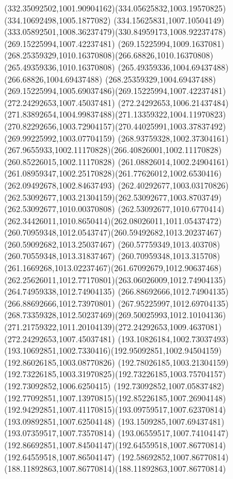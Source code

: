 {{		\curveto(332.35092502,1001.90904162)(334.05625832,1003.19570825)(334.10692498,1005.1877082)
		\curveto(334.15625831,1007.10504149)(333.05892501,1008.36237479)(330.84959173,1008.92237478)
		\moveto(269.15225994,1007.42237481)
		\curveto(269.15225994,1009.1637081)(268.25359329,1010.16370808)(266.68826,1010.16370808)
		\lineto(265.49359336,1010.16370808)
		\lineto(265.49359336,1004.69437488)
		\lineto(266.68826,1004.69437488)
		\curveto(268.25359329,1004.69437488)(269.15225994,1005.69037486)(269.15225994,1007.42237481)
		\moveto(272.24292653,1007.45037481)
		\curveto(272.24292653,1006.21437484)(271.83892654,1004.99837488)(271.13359322,1004.11970823)
		\curveto(270.82292656,1003.72904157)(270.44025991,1003.37837492)(269.99225992,1003.07704159)
		\curveto(268.93759328,1002.37304161)(267.9655933,1002.11170828)(266.40826001,1002.11170828)
		\lineto(260.85226015,1002.11170828)
		\lineto(261.08826014,1002.24904161)
		\curveto(261.08959347,1002.25170828)(261.77626012,1002.6530416)(262.09492678,1002.84637493)
		\curveto(262.40292677,1003.03170826)(262.53092677,1003.21304159)(262.53092677,1003.8703749)
		\lineto(262.53092677,1010.00370808)
		\curveto(262.53092677,1010.6770414)(262.34426011,1010.8650414)(262.08026011,1011.05437472)
		\curveto(260.70959348,1012.0543747)(260.59492682,1013.20237467)(260.59092682,1013.25037467)
		\lineto(260.57759349,1013.403708)
		\lineto(260.70559348,1013.31837467)
		\curveto(260.70959348,1013.315708)(261.1669268,1013.02237467)(261.67092679,1012.90637468)
		\curveto(262.25626011,1012.77170801)(263.06026009,1012.74904135)(264.74959338,1012.74904135)
		\lineto(266.88692666,1012.74904135)
		\lineto(266.88692666,1012.73970801)
		\curveto(267.95225997,1012.69704135)(268.73359328,1012.50237469)(269.50025993,1012.10104136)
		\curveto(271.21759322,1011.20104139)(272.24292653,1009.4637081)(272.24292653,1007.45037481)
		\moveto(193.10826184,1002.73037493)
		\curveto(193.10692851,1002.7330416)(192.95092851,1002.94504159)(192.86026185,1003.08770826)
		\curveto(192.78026185,1003.21304159)(192.73226185,1003.31970825)(192.73226185,1003.75704157)
		\lineto(192.73092852,1006.6250415)
		\curveto(192.73092852,1007.05837482)(192.77092851,1007.13970815)(192.85226185,1007.26904148)
		\curveto(192.94292851,1007.41170815)(193.09759517,1007.62370814)(193.09892851,1007.62504148)
		\lineto(193.1509285,1007.69437481)
		\lineto(193.07359517,1007.73570814)
		\curveto(193.06559517,1007.74104147)(192.86692851,1007.84504147)(192.64559518,1007.86770814)
		\lineto(192.64559518,1007.86504147)
		\curveto(192.58692852,1007.86770814)(188.11892863,1007.86770814)(188.11892863,1007.86770814)
}}
